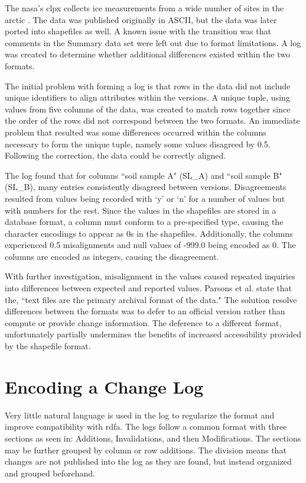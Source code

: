 The \gls{nasa}'s \gls{clpx} collects ice measurements from a wide number of sites in the arctic \cite{CLPX}.
The data was published originally in ASCII, but the data was later ported into shapefiles as well.
A known issue with the transition was that comments in the Summary data set were left out due to format limitations.
A \gls{log} was created to determine whether additional differences existed within the two formats.

The initial problem with forming a \gls{log} is that rows in the data did not include unique identifiers to align \glspl{attribute} within the \glspl{version}.
A unique tuple, using values from five columns of the data, was created to match rows together since the order of the rows did not correspond between the two formats.
An immediate problem that resulted was some differences occurred within the columns necessary to form the unique tuple, namely some values disagreed by 0.5.
Following the correction, the data could be correctly aligned.

The \gls{log} found that for columns ``soil sample A" (SL\_A) and ``soil sample B" (SL\_B), many entries consistently disagreed between \glspl{version}.
Disagreements resulted from values being recorded with `y' or `n' for a number of values but with numbers for the rest.
Since the values in the shapefiles are stored in a database format, a column must conform to a pre-specified type, causing the character encodings to appear as 0s in the shapefiles.
Additionally, the columns experienced 0.5 misalignments and null values of -999.0 being encoded as 0.
The columns are encoded as integers, causing the disagreement.

With further investigation, misalignment in the values caused repeated inquiries into differences between expected and reported values.
Parsons et al. \cite{CLPX2} state that the, ``text files are the primary archival format of the data."
The solution resolve differences between the formats was to defer to an official version rather than compute or provide change information.
The deference to a different format, unfortunately partially undermines the benefits of increased accessibility provided by the shapefile format.

\section{Encoding a Change Log}

Very little natural language is used in the \gls{log} to regularize the format and improve compatibility with \gls{rdfa}.
The \glspl{log} follow a common format with three sections as seen in: Additions, Invalidations, and then Modifications.
The sections may be further grouped by column or row additions.
The division means that \glspl{change} are not published into the \gls{log} as they are found, but instead organized and grouped beforehand.

